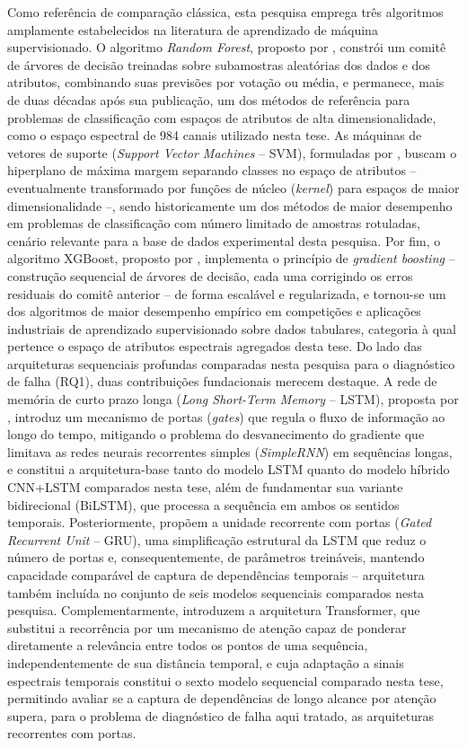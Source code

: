 \documentclass[times,final]{elsarticle}
\begin{document}
Como referência de comparação clássica, esta pesquisa emprega três algoritmos amplamente estabelecidos na literatura de aprendizado de máquina supervisionado. O algoritmo \textit{Random Forest}, proposto por \citet{breiman2001}, constrói um comitê de árvores de decisão treinadas sobre subamostras aleatórias dos dados e dos atributos, combinando suas previsões por votação ou média, e permanece, mais de duas décadas após sua publicação, um dos métodos de referência para problemas de classificação com espaços de atributos de alta dimensionalidade, como o espaço espectral de 984 canais utilizado nesta tese. As máquinas de vetores de suporte (\textit{Support Vector Machines} -- SVM), formuladas por \citet{cortes1995}, buscam o hiperplano de máxima margem separando classes no espaço de atributos -- eventualmente transformado por funções de núcleo (\textit{kernel}) para espaços de maior dimensionalidade --, sendo historicamente um dos métodos de maior desempenho em problemas de classificação com número limitado de amostras rotuladas, cenário relevante para a base de dados experimental desta pesquisa. Por fim, o algoritmo XGBoost, proposto por \citet{chen2016xgboost}, implementa o princípio de \textit{gradient boosting} -- construção sequencial de árvores de decisão, cada uma corrigindo os erros residuais do comitê anterior -- de forma escalável e regularizada, e tornou-se um dos algoritmos de maior desempenho empírico em competições e aplicações industriais de aprendizado supervisionado sobre dados tabulares, categoria à qual pertence o espaço de atributos espectrais agregados desta tese.
Do lado das arquiteturas sequenciais profundas comparadas nesta pesquisa para o diagnóstico de falha (RQ1), duas contribuições fundacionais merecem destaque. A rede de memória de curto prazo longa (\textit{Long Short-Term Memory} -- LSTM), proposta por \citet{hochreiter1997}, introduz um mecanismo de portas (\textit{gates}) que regula o fluxo de informação ao longo do tempo, mitigando o problema do desvanecimento do gradiente que limitava as redes neurais recorrentes simples (\textit{SimpleRNN}) em sequências longas, e constitui a arquitetura-base tanto do modelo LSTM quanto do modelo híbrido CNN+LSTM comparados nesta tese, além de fundamentar sua variante bidirecional (BiLSTM), que processa a sequência em ambos os sentidos temporais. Posteriormente, \citet{cho2014} propõem a unidade recorrente com portas (\textit{Gated Recurrent Unit} -- GRU), uma simplificação estrutural da LSTM que reduz o número de portas e, consequentemente, de parâmetros treináveis, mantendo capacidade comparável de captura de dependências temporais -- arquitetura também incluída no conjunto de seis modelos sequenciais comparados nesta pesquisa. Complementarmente, \citet{vaswani2017} introduzem a arquitetura Transformer, que substitui a recorrência por um mecanismo de atenção capaz de ponderar diretamente a relevância entre todos os pontos de uma sequência, independentemente de sua distância temporal, e cuja adaptação a sinais espectrais temporais constitui o sexto modelo sequencial comparado nesta tese, permitindo avaliar se a captura de dependências de longo alcance por atenção supera, para o problema de diagnóstico de falha aqui tratado, as arquiteturas recorrentes com portas.
\end{document}
